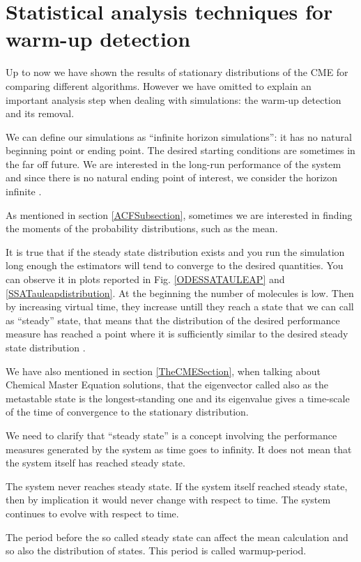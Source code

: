 \documentclass[12pt,a4paper]{report}
\begin{document}
\section{Statistical analysis techniques for warm-up detection}
Up to now we have shown the results of stationary distributions of the CME for comparing different algorithms. However we have omitted to explain an important analysis step when dealing with simulations: the warm-up detection and its removal. 

We can define our simulations as  ``infinite horizon simulations'': it has no natural beginning point or ending point. The desired starting conditions are sometimes in the far off future. We are interested in the long-run performance of the system and since there is no natural ending point of interest, we consider the horizon infinite \cite{Manuel}.  

As mentioned in section \ref{ACFSubsection}, sometimes we are interested in finding the moments of the probability distributions, such as the mean.

It is true that if the steady state distribution exists and you run the simulation long enough the estimators will tend to converge to the desired quantities. You can observe it in plots reported in Fig. \ref{ODESSATAULEAP} and \ref{SSATauleapdistribution}. At the beginning the number of molecules is low. Then by increasing virtual time, they increase untill they reach a state that we can call as ``steady'' state, that means that the distribution of the desired performance measure has reached a point where it is sufficiently similar to the desired steady state distribution \cite{Manuel}. 

We have also mentioned in section \ref{TheCMESection}, when talking about Chemical Master Equation solutions, that the eigenvector called also as the metastable state is the longest-standing one and its eigenvalue gives a time-scale of the time of convergence to the stationary distribution.

We need to clarify that ``steady state'' is a concept involving the performance measures generated by the system as time goes to infinity. It does not mean that the system itself has reached steady state.

The system never reaches steady state. If the system itself reached steady state, then by implication it would never change with respect to time. The system continues to evolve with respect to time.

The period before the so called steady state can affect the mean calculation and so also the distribution of states. This period is called warmup-period.
\end{document}
